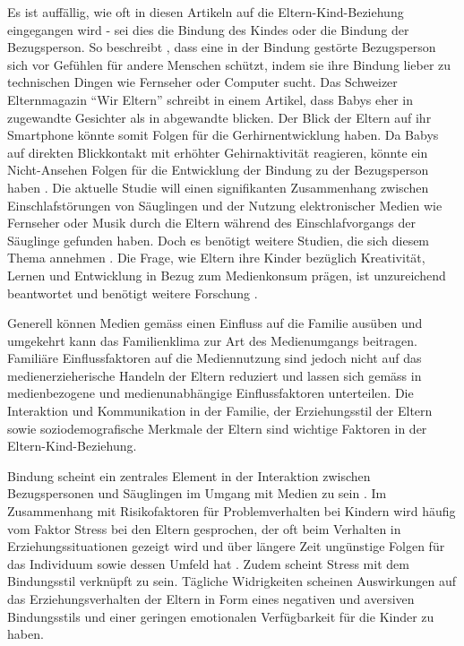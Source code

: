 Es ist auffällig, wie oft in diesen Artikeln auf die Eltern-Kind-Beziehung eingegangen wird - sei dies die Bindung des Kindes oder die Bindung der Bezugsperson. So beschreibt , dass eine in der Bindung gestörte Bezugsperson sich vor Gefühlen für andere Menschen schützt, indem sie ihre Bindung lieber zu technischen Dingen wie Fernseher oder Computer sucht. Das Schweizer Elternmagazin \enquote{Wir Eltern} schreibt in einem Artikel, dass Babys eher in zugewandte Gesichter als in abgewandte blicken. Der Blick der Eltern auf ihr Smartphone könnte somit Folgen für die Gerhirnentwicklung haben. Da Babys auf direkten Blickkontakt mit erhöhter Gehirnaktivität reagieren, könnte ein Nicht-Ansehen Folgen für die Entwicklung der Bindung zu der Bezugsperson haben \cite{Weber2017}. Die aktuelle Studie  will einen signifikanten Zusammenhang zwischen Ein\-schlaf\-stör\-ungen von Säuglingen und der Nutzung elektronischer Medien wie Fernseher oder Musik durch die Eltern während des Einschlafvorgangs der Säuglinge gefunden haben. Doch es benötigt weitere Studien, die sich diesem Thema annehmen \cite{Wartella2016}. Die Frage, wie Eltern ihre Kinder bezüglich Kreativität, Lernen und Entwicklung in Bezug zum Medienkonsum prägen, ist unzureichend beantwortet und benötigt weitere Forschung \cite{AmericanAcademyofPediatrics2011,Troseth2016}. 

Generell können Medien gemäss  einen Einfluss auf die Familie ausüben und umgekehrt kann das Familienklima zur Art des Me\-di\-en\-um\-gangs beitragen. Familiäre Einflussfaktoren auf die Mediennutzung sind  jedoch  nicht  auf  das  medienerzieherische  Handeln  der  Eltern  reduziert  und  lassen sich gemäss  in medienbezogene und medienunabhängige Einflussfaktoren unterteilen. Die Interaktion und Kommunikation in der Familie, der Erziehungsstil der Eltern sowie so\-zio\-de\-mo\-gra\-fische Merkmale der Eltern sind wichtige Faktoren in der Eltern-Kind-Beziehung.

Bindung scheint ein zentrales Element in der Interaktion zwischen Bezugspersonen und Säuglingen im Umgang mit Medien zu sein \cite{Prekop2017, Huether2017, Blikk2017}. Im Zusammenhang mit Risikofaktoren für Problemverhalten bei Kindern wird häufig vom Faktor Stress bei den Eltern gesprochen, der oft beim Verhalten in Erziehungssituationen gezeigt wird und über längere Zeit ungünstige Folgen für das Individuum sowie dessen Umfeld hat \cite{Cina2009}. Zudem scheint Stress mit dem Bindungsstil verknüpft zu sein. Tägliche Widrigkeiten scheinen Auswirkungen auf das Erziehungsverhalten der Eltern in Form eines negativen und aversiven Bindungsstils \cite{Dumas1989, Webster-Stratton1988} und einer geringen emotionalen Verfügbarkeit für die Kinder \cite{Campbell1991} zu haben. 

